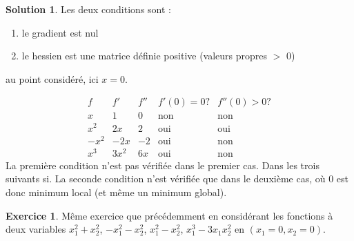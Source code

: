 \documentclass[a4paper,francais]{article}
\theoremstyle{definition}
\newtheorem{exercice}{Exercice}[section]
\newtheorem*{solution}{Solution}
\begin{document}
\begin{solution}
  Les deux conditions sont :
  \begin{enumerate}
  \item le gradient est nul 
  \item le hessien est une matrice définie positive (valeurs propres $>$ 0)
  \end{enumerate}
  au point considéré, ici $x=0$. 
  
  \[
  \begin{array}{c|c|c|c|c}
    f & f' & f'' & f'(0) = 0? & f''(0) > 0? \\ \hline
    x & 1  & 0 & \text{non} & \text{non}  \\
    x^2 & 2x & 2 & \text{oui} & \text{oui}\\
    -x^2 & -2x & -2 & \text{oui} & \text{non} \\
    x^3 & 3x^2 & 6x & \text{oui} & \text{non}
  \end{array}
  \]
  La première condition n'est pas vérifiée dans le premier cas. Dans les trois suivants si.
  La seconde condition n'est vérifiée que dans le deuxième cas, où $0$ est donc minimum local
  (et même un minimum global).
\end{solution}

\begin{exercice}
  Même exercice que précédemment en considérant 
  les fonctions à deux variables  $x_1^2 + x_2^2$, $-x_1^2 -x_2^2$,
  $x_1^2 -x_2^2$, $x_1^3 - 3x_1x_2^2$
  en $(x_1 = 0, x_2 = 0)$.  
\end{exercice}
\end{document}

